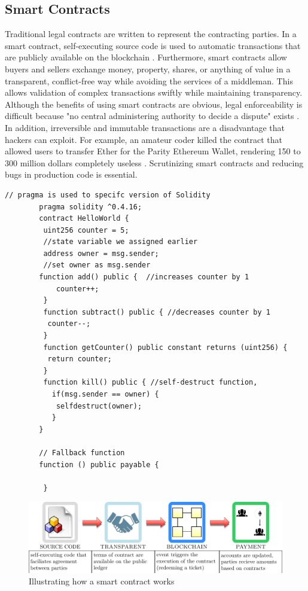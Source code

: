 \subsection{Smart Contracts}
	\begin{minipage}[h]{0.5\linewidth}
		Traditional legal contracts are written to represent the contracting parties. In a smart contract, self-executing source code is used to automatic transactions that are publicly available on the blockchain \cite{ethereumWhitePaper:Online}.
		Furthermore, smart contracts allow buyers and sellers exchange money, property, shares, or anything of value in a transparent, conflict-free way while avoiding the services of a middleman. This allows validation of complex transactions swiftly while maintaining transparency. Although the benefits of using smart contracts are obvious, legal enforceability is difficult because "no central administering authority to decide a dispute" exists \cite{keyfindings:Online}. In addition, irreversible and immutable transactions are a disadvantage that hackers can exploit. For example, an amateur coder killed the contract that allowed users to transfer Ether for the Parity Ethereum Wallet, rendering 150 to 300 million dollars completely useless \cite{funnyJoke:Online}. Scrutinizing smart contracts and reducing bugs in production code is essential.
	\end{minipage}
	\begin{minipage}[h]{0.5\linewidth}
		\begin{lstlisting}[language=Solidity,caption=Smart contract in Solidity]
		// pragma is used to specifc version of Solidity
		pragma solidity ^0.4.16;
		contract HelloWorld {
		 uint256 counter = 5; 
		 //state variable we assigned earlier
		 address owner = msg.sender; 
		 //set owner as msg.sender
		function add() public {  //increases counter by 1
	  		counter++;
		 }
		 function subtract() public { //decreases counter by 1
		  counter--;
		 }
		 function getCounter() public constant returns (uint256) {
		  return counter;
		 } 
		 function kill() public { //self-destruct function, 
		   if(msg.sender == owner) {
		    selfdestruct(owner); 
		   }
		}
		
		// Fallback function
		function () public payable {
		
		 }
		\end{lstlisting}
	\end{minipage}

	\begin{warpprint}
	\begin{figure}[ht]
		\centering
		\includegraphics[width=1\linewidth]{Diagrams/smartContractsExp.pdf}
		\caption{Illustrating how a smart contract works}
		\label{fig:smartContracts}
	\end{figure}
	\end{warpprint}
	
